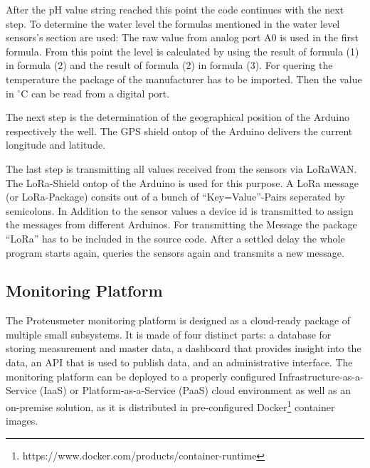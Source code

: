 \documentclass[11pt, letterpaper]{article}
\begin{document}
After the pH value string reached this point the code continues with the next step. To determine the water level the formulas mentioned in the water level sensors's section are used: The raw value from analog port A0 is used in the first formula. From this point the level is calculated by using the result of formula (1) in formula (2) and the result of formula (2) in formula (3). For quering the temperature the package of the manufacturer has to be imported. Then the value in $^\circ$C can be read from a digital port.
%	
\newline

The next step is the determination of the geographical position of the Arduino respectively the well. The GPS shield ontop of the Arduino delivers the current longitude and latitude. 
\newline

The last step is transmitting all values received from the sensors via LoRaWAN. The LoRa-Shield ontop of the Arduino is used for this purpose. A LoRa message (or LoRa-Package) consits out of a bunch of ``Key=Value''-Pairs seperated by semicolons. In Addition to the sensor values a device id is transmitted to assign the messages from different Arduinos. For transmitting the Message the package ``LoRa'' has to be included in the source code. After a settled delay the whole program starts again, queries the sensors again and transmits a new message.


\subsection{Monitoring Platform}
The Proteusmeter monitoring platform is designed as a cloud-ready package of multiple small subsystems. It is made of four distinct parts: a database for storing measurement and master data, a dashboard that provides insight into the data, an API that is used to publish data, and an administrative interface. The monitoring platform can be deployed to a properly configured Infrastructure-as-a-Service (IaaS) or Platform-as-a-Service (PaaS) cloud environment as well as an on-premise solution, as it is distributed in pre-configured Docker\footnote{https://www.docker.com/products/container-runtime} container images.
\end{document}
